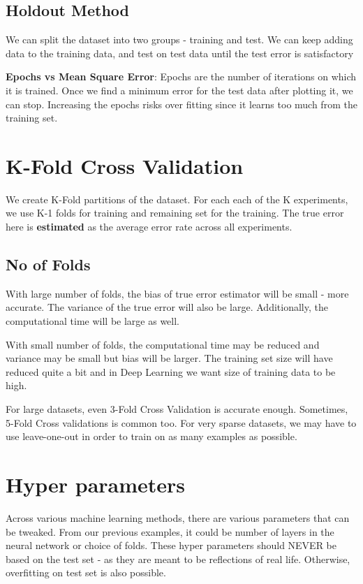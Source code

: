 \subsection{Holdout Method}

We can split the dataset into two groups - training and test. We can keep adding data to the training data, and test on test data until the test error is satisfactory

\textbf{Epochs vs Mean Square Error}: Epochs are the number of iterations on which it is trained. Once we find a minimum error for the test data after plotting it, we can stop. Increasing the epochs risks over fitting since it learns too much from the training set.

\section{K-Fold Cross Validation}

We create K-Fold partitions of the dataset. For each each of the K experiments, we use K-1 folds for training and remaining set for the training. The true error here is \textbf{estimated} as the average error rate across all experiments. 

\subsection{No of Folds}

With large number of folds, the bias of true error estimator will be small - more accurate. The variance of the true error will also be large. Additionally, the computational time will be large as well.

With small number of folds, the computational time may be reduced and variance may be small but bias will be larger. The training set size will have reduced quite a bit and in Deep Learning we want size of training data to be high. 

For large datasets, even 3-Fold Cross Validation is accurate enough. Sometimes, 5-Fold Cross validations is common too. For very sparse datasets, we may have to use leave-one-out in order to train on as many examples as possible. 

\section{Hyper parameters}

Across various machine learning methods, there are various parameters that can be tweaked. From our previous examples, it could be number of layers in the neural network or choice of folds. These hyper parameters should NEVER be based on the test set - as they are meant to be reflections of real life. Otherwise, overfitting on test set is also possible. 

